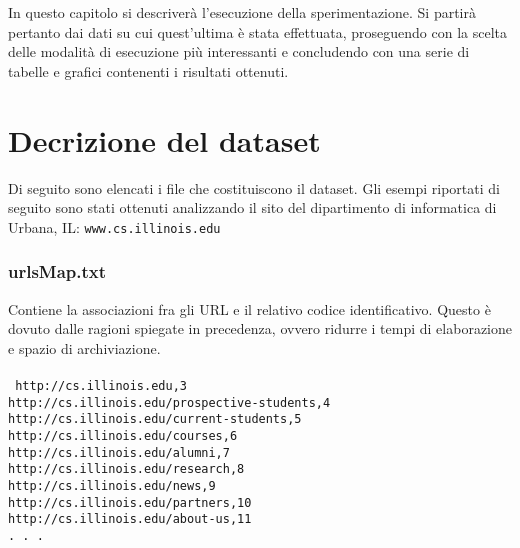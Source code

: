 

In questo capitolo si descriverà l'esecuzione della sperimentazione. Si partirà pertanto dai dati su cui quest'ultima è stata effettuata, proseguendo con la scelta delle modalità di esecuzione più interessanti e concludendo con una serie di tabelle e grafici contenenti i risultati ottenuti. 

\section{Decrizione del dataset}
Di seguito sono elencati i file che costituiscono il dataset. Gli esempi riportati di seguito sono stati ottenuti analizzando il sito del dipartimento di informatica di Urbana, IL: \texttt{www.cs.illinois.edu}

\subsubsection{urlsMap.txt}
Contiene la associazioni fra gli URL e il relativo codice identificativo. Questo è dovuto dalle ragioni spiegate in precedenza, ovvero ridurre i tempi di elaborazione e spazio di archiviazione. 
\\\\
\texttt{
http://cs.illinois.edu,3\\
http://cs.illinois.edu/prospective-students,4\\
http://cs.illinois.edu/current-students,5\\
http://cs.illinois.edu/courses,6\\
http://cs.illinois.edu/alumni,7\\
http://cs.illinois.edu/research,8\\
http://cs.illinois.edu/news,9\\
http://cs.illinois.edu/partners,10\\
http://cs.illinois.edu/about-us,11\\
. . .\\
}
